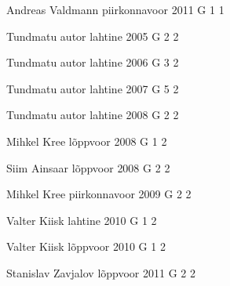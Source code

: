 \documentclass[11pt]{article}
\begin{document}
{Andreas Valdmann} %
{piirkonnavoor} %
{2011} %
{G 1} %
{1} %
{

\ifEngHint
\fi
}

{Tundmatu autor} %
{lahtine} %
{2005} %
{G 2} %
{2} %
{

\ifEngHint
\fi
}

{Tundmatu autor} %
{lahtine} %
{2006} %
{G 3} %
{2} %
{

\ifEngHint
\fi
}

{Tundmatu autor} %
{lahtine} %
{2007} %
{G 5} %
{2} %
{

\ifEngHint
\fi
}

{Tundmatu autor} %
{lahtine} %
{2008} %
{G 2} %
{2} %
{

\ifEngHint
\fi
}

{Mihkel Kree} %
{lõppvoor} %
{2008} %
{G 1} %
{2} %
{

\ifEngHint
\fi
}

{Siim Ainsaar} %
{lõppvoor} %
{2008} %
{G 2} %
{2} %
{

\ifEngHint
\fi
}

{Mihkel Kree} %
{piirkonnavoor} %
{2009} %
{G 2} %
{2} %
{

\ifEngHint
\fi
}

{Valter Kiisk} %
{lahtine} %
{2010} %
{G 1} %
{2} %
{

\ifEngHint
\fi
}

{Valter Kiisk} %
{lõppvoor} %
{2010} %
{G 1} %
{2} %
{

\ifEngHint
\fi
}

{Stanislav Zavjalov} %
{lõppvoor} %
{2011} %
{G 2} %
{2} %
{

\ifEngHint
\fi
}
\end{document}
